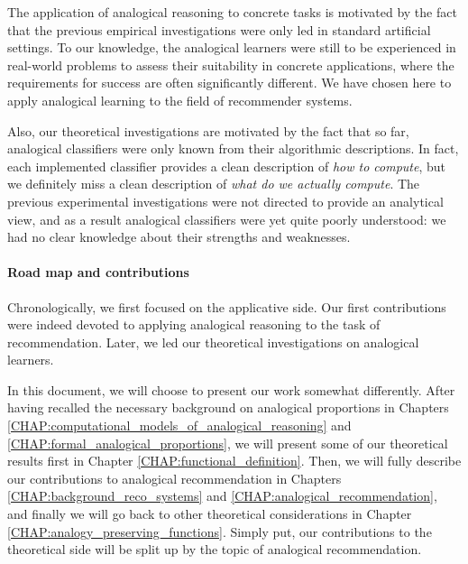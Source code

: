 The application of analogical reasoning to concrete tasks is motivated by the
fact that the previous empirical investigations were only led in standard
artificial settings. To our knowledge, the analogical learners were still to be
experienced in real-world problems to assess their suitability in concrete
applications, where the requirements for success are often significantly
different. We have chosen here to apply analogical learning to the field of
recommender systems.

Also, our theoretical investigations are motivated by the fact that so far,
analogical classifiers were only known from their algorithmic descriptions.  In
fact, each implemented classifier provides a clean description of {\it how to
compute}, but we definitely miss a clean description of {\it what do we
actually compute}. The previous experimental investigations were not directed
to provide an analytical view, and as a result analogical classifiers were yet
quite poorly understood: we had no clear knowledge about their strengths and
weaknesses.

\paragraph{Road map and contributions\\}

Chronologically, we first focused on the applicative side. Our first
contributions were indeed devoted to applying analogical reasoning to the task
of recommendation. Later, we led our theoretical investigations on
analogical learners.

In this document, we will choose to present our work somewhat differently.
After having recalled the necessary background on analogical proportions in
Chapters \ref{CHAP:computational_models_of_analogical_reasoning} and
\ref{CHAP:formal_analogical_proportions}, we
will present some of our
theoretical results first in Chapter \ref{CHAP:functional_definition}. Then, we will
fully describe our contributions to analogical recommendation  in Chapters
\ref{CHAP:background_reco_systems} and \ref{CHAP:analogical_recommendation},
and finally we will go back to other theoretical considerations in Chapter
\ref{CHAP:analogy_preserving_functions}. Simply put, our contributions to the
theoretical side will be split up by the topic of analogical recommendation.

